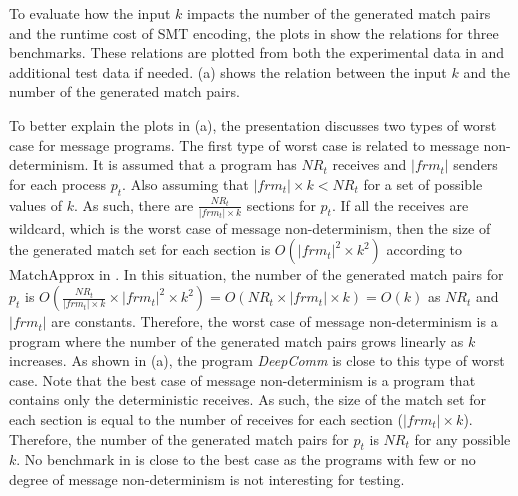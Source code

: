 To evaluate how the input $k$ impacts the number of the generated match pairs and the runtime cost of SMT encoding, the plots in  show the relations for three benchmarks. 
These relations are plotted from both the experimental data in  and additional test data if needed.  (a) shows the relation between the input $k$ and the number of the generated match pairs. 

To better explain the plots in  (a), the presentation discusses two types of worst case for message programs. 
The first type of worst case is related to message non-determinism. 
It is assumed that a program has $\mathit{NR}_t$ receives and $|frm_t|$ senders for each process $p_t$. Also assuming that $|frm_t|\times k < \mathit{NR}_t$ for a set of possible values of $k$. As such, there are $\frac{\mathit{NR}_t}{|frm_t|\times k}$ sections for $p_t$.
If all the receives are wildcard, which is the worst case of message non-determinism, then the size of the generated match set for each section is $O(|frm_t|^2\times k^2)$ according to $\mathrm{MatchApprox}$ in . In this situation, the number of the generated match pairs for $p_t$ is $O(\frac{\mathit{NR}_t}{|frm_t|\times k} \times |frm_t|^2\times k^2) = O(\mathit{NR}_t \times |frm_t| \times k) = O(k)$ as $\mathit{NR}_t$ and $|frm_t|$ are constants. Therefore, the worst case of message non-determinism is a program where the number of the generated match pairs grows linearly as $k$ increases. As shown in  (a), the program \textit{DeepComm} is close to this type of worst case. Note that the best case of message non-determinism is a program that contains only the deterministic receives. As such, the size of the match set for each section is equal to the number of receives for each section ($|frm_t|\times k$). Therefore, the number of the generated match pairs for $p_t$ is $\mathit{NR}_t$ for any possible $k$. No benchmark in  is close to the best case as the programs with few or no degree of message non-determinism is not interesting for testing.  

